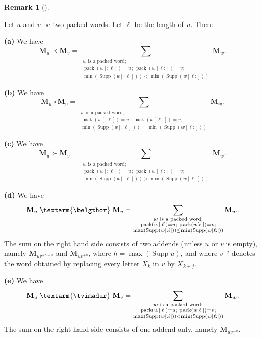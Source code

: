 \documentclass[numbers=enddot,12pt,final,onecolumn,notitlepage,abstracton]{scrartcl}%
\theoremstyle{definition}
\newtheorem{remk}[theo]{Remark}
\newenvironment{remark}[1][]
{\begin{remk}[#1]\begin{leftbar}}
{\end{leftbar}\end{remk}}
\newcommand{\tvi}{\left. \textarm{\tvimadur} \right.}
\newcommand{\bel}{\left. \textarm{\belgthor} \right.}
\let\sumnonlimits\sum
\renewcommand{\sum}{\sumnonlimits\limits}
\begin{document}
\begin{remark}
\label{rmk.WQSym.closed}Let $u$ and $v$ be two packed words. Let $\ell$ be the
length of $u$. Then:

\textbf{(a)} We have%
\[
\mathbf{M}_{u}\left.  \prec\right.  \mathbf{M}_{v}=\sum_{\substack{w\text{ is
a packed word;}\\\operatorname*{pack}\left(  w\left[  :\ell\right]  \right)
=u;\ \operatorname*{pack}\left(  w\left[  \ell:\right]  \right)
=v;\\\min\left(  \operatorname*{Supp}\left(  w\left[  :\ell\right]  \right)
\right)  <\min\left(  \operatorname*{Supp}\left(  w\left[  \ell:\right]
\right)  \right)  }}\mathbf{M}_{w}.
\]


\textbf{(b)} We have%
\[
\mathbf{M}_{u}\circ\mathbf{M}_{v}=\sum_{\substack{w\text{ is a packed
word;}\\\operatorname*{pack}\left(  w\left[  :\ell\right]  \right)
=u;\ \operatorname*{pack}\left(  w\left[  \ell:\right]  \right)
=v;\\\min\left(  \operatorname*{Supp}\left(  w\left[  :\ell\right]  \right)
\right)  =\min\left(  \operatorname*{Supp}\left(  w\left[  \ell:\right]
\right)  \right)  }}\mathbf{M}_{w}.
\]


\textbf{(c)} We have%
\[
\mathbf{M}_{u}\left.  \succ\right.  \mathbf{M}_{v}=\sum_{\substack{w\text{ is
a packed word;}\\\operatorname*{pack}\left(  w\left[  :\ell\right]  \right)
=u;\ \operatorname*{pack}\left(  w\left[  \ell:\right]  \right)
=v;\\\min\left(  \operatorname*{Supp}\left(  w\left[  :\ell\right]  \right)
\right)  >\min\left(  \operatorname*{Supp}\left(  w\left[  \ell:\right]
\right)  \right)  }}\mathbf{M}_{w}.
\]


\textbf{(d)} We have%
\[
\mathbf{M}_{u} \bel \mathbf{M}_{v}=\sum_{\substack{w\text{ is a packed
word;}\\\operatorname*{pack}\left(  w\left[  :\ell\right]  \right)
=u;\ \operatorname*{pack}\left(  w\left[  \ell:\right]  \right)
=v;\\\max\left(  \operatorname*{Supp}\left(  w\left[  :\ell\right]  \right)
\right)  \leq\min\left(  \operatorname*{Supp}\left(  w\left[  \ell:\right]
\right)  \right)  }}\mathbf{M}_{w}.
\]
The sum on the right hand side consists of two addends (unless $u$ or $v$ is
empty), namely $\mathbf{M}_{uv^{+h-1}}$ and $\mathbf{M}_{uv^{+h}}$, where
$h=\max\left(  \operatorname*{Supp}u\right)  $, and where $v^{+j}$ denotes the
word obtained by replacing every letter $X_{k}$ in $v$ by $X_{k+j}$.

\textbf{(e)} We have%
\[
\mathbf{M}_{u} \tvi \mathbf{M}_{v}=\sum_{\substack{w\text{ is a packed
word;}\\\operatorname*{pack}\left(  w\left[  :\ell\right]  \right)
=u;\ \operatorname*{pack}\left(  w\left[  \ell:\right]  \right)
=v;\\\max\left(  \operatorname*{Supp}\left(  w\left[  :\ell\right]  \right)
\right)  <\min\left(  \operatorname*{Supp}\left(  w\left[  \ell:\right]
\right)  \right)  }}\mathbf{M}_{w}.
\]
The sum on the right hand side consists of one addend only, namely
$\mathbf{M}_{uv^{+h}}$.
\end{remark}
\end{document}
